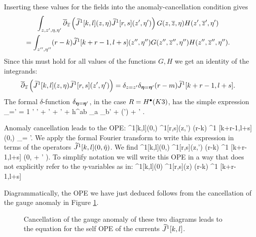 \documentclass[../main.tex]{subfiles}
\begin{document}
Inserting these values for the fields into the anomaly-cancellation condition gives
\begin{multline} 
	\int_{z,z', \eta,\eta'} \overline{\partial}_{{\overline{z}}} \left( \widetilde{J}^1[k,l] (z,\eta)  \widetilde{J}^1[r,s] (z',\eta') \right)  G(z,{\overline{z}},\eta) H(z',{\overline{z}}',\eta') \\ 
	= \int_{z'',\eta''} (r-k)  \widetilde{J}^1[k+r-1, l+s] (z'',\eta'')  G(z'',{\overline{z}}'',\eta'') H(z'',{\overline{z}}'', \eta'').
\end{multline}
Since this must hold for all values of the functions $G,H$ we get an identity of the integrands:
\[ 
	\overline{\partial}_{{\overline{z}}} \left( \widetilde{J}^1[k, l] (z,\eta)  \widetilde{J}^1[r,s] (z',\eta') \right)  = \delta_{z = z'} \delta_{\boldsymbol\eta = \boldsymbol\eta'} (r-m) \widetilde{J}^1[k + r -1, l+s] .  
\]
The formal $\delta$-function $\delta_{\boldsymbol\eta = \boldsymbol\eta'}$, in the case $R = H^{\bullet}(K3)$, has the simple expression 
\beqn
\delta_{\bfeta=\bfeta'} = 1 \otimes \eta' \br \eta' + \eta \otimes \br \eta' + \br \eta \otimes \eta' + h^{ab} \eta_a \otimes \eta_b' + (\bfeta \leftrightarrow \bfeta') + \eta \br \eta {}' .
\eeqn

Anomaly cancellation leads to the OPE:
\beqn
		^1[k,l](0,\eta)  ^1[r,s](z,\eta')  
	\simeq {} (r-k)  ^1 [k+r-1,l+s] (0,\eta) \delta_{\eta = \eta'}. 
\eeqn
We apply the formal Fourier transform to write this expression in terms of the operators $\widetilde{J}^1[k,l] (0, \Hat{\eta})$.
We find
\beqn
	^1[k,l](0,\what{\eta})  ^1[r,s](z,\what{\eta}')  
	\simeq {} (r-k)  ^1 [k+r-1,l+s] (0,\what{\eta} + \what{\eta}' ). 
\eeqn
To simplify notation we will write this OPE in a way that does not explicitly refer to the $\eta$-variables as in:
\beqn
		^1[k,l](0) ^1[r,s](z)  
	\simeq {} (r-k)  ^1 [k+r-1,l+s] 
\eeqn

Diagrammatically, the OPE we have just deduced follows from the cancellation of the gauge anomaly in Figure \ref{fig:JJcancel}.


\begin{figure}
	\caption{Cancellation of the gauge anomaly of these two diagrams leads to the equation for the self OPE of the currents $\widetilde{J}^1[k,l]$. \label{fig:JJcancel}}
\end{figure}
\end{document}
